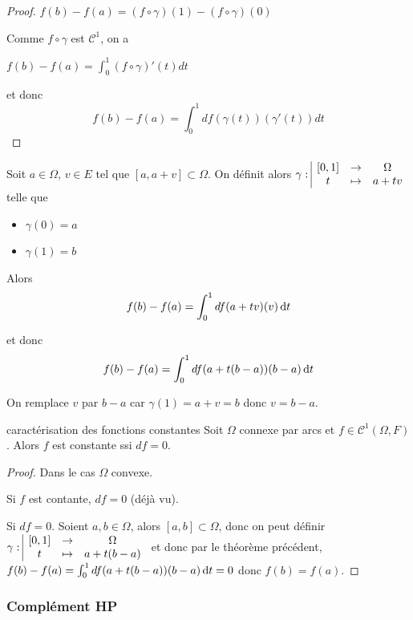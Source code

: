 \begin{proof}
    $f(b) - f(a) = (f \circ \gamma)(1) - (f \circ \gamma)(0)$

    Comme $f \circ \gamma$ est $\mathscr C^1$, on a 

    $f(b) - f(a) = \int_0^1 (f \circ \gamma)'(t) dt$

    et donc 
    $$f(b) - f(a) = \int_0^1 df(\gamma(t))(\gamma'(t)) dt$$
\end{proof}

\begin{proposition}{}{}
    Soit $a \in \Omega$, $v \in E$ tel que 
    $[a, a + v] \subset \Omega$. On définit alors 
    $\gamma: \space \begin{array}{|ccc} \displaystyle [0, 1] & \to & \displaystyle \Omega \\ \displaystyle t & \mapsto & \displaystyle a + t v \end{array}$ telle que 

    \begin{itemize}
        \item $\gamma(0) = a$
        \item $\gamma(1) = b$
    \end{itemize} Alors 
    $$f(b) - f(a) = \int_0^1 df(a + tv)(v) \,\mathrm{d}t$$

    et donc $$f(b) - f(a) = \int_0^1 df(a + t(b - a))(b - a) \,\mathrm{d}t$$
\end{proposition}

\begin{remarque}
    On remplace $v$ par $b - a$ car $\gamma(1) = a + v = b$ donc $v = b - a$.
\end{remarque}

\begin{corollaire}{}{caractérisation des fonctions constantes}{}
    Soit $\Omega$ connexe par arcs et $f \in \mathscr C^1(\Omega, F)$. Alors $f$ est 
    constante ssi $df = 0$. 
\end{corollaire}


\begin{proof}
    Dans le cas $\Omega$ convexe. 

    Si $f$ est contante, $df = 0$ (déjà vu).

    Si $df = 0$. Soient $a, b \in \Omega$, alors $[a, b] \subset \Omega$, 
    donc on peut définir \\
    $\gamma: \space \begin{array}{|ccc} \displaystyle [0, 1] & \to & \displaystyle \Omega \\ \displaystyle t & \mapsto & \displaystyle a + t(b - a) \end{array}$ et donc 
    par le théorème précédent,
    $f(b) - f(a) = \int_0^1 df(a + t(b - a))(b - a) \,\mathrm{d}t = 0$ donc $f(b) = f(a)$.
\end{proof}

\subsubsection{Complément HP}

